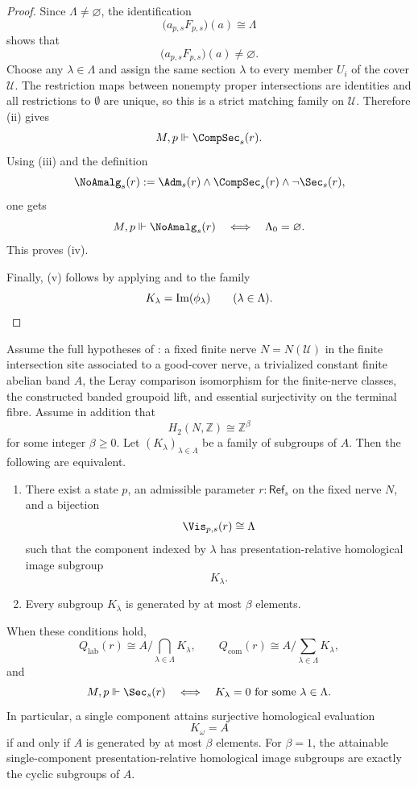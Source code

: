 \begin{proof}
Since $\Lambda\neq\varnothing$, the identification
\[
\bigl(a_{p,s}F_{p,s}\bigr)(a)\cong \Lambda
\]
shows that
\[
\bigl(a_{p,s}F_{p,s}\bigr)(a)\neq\varnothing.
\]
Choose any $\lambda\in\Lambda$ and assign the same section $\lambda$ to
every member $U_i$ of the cover $\mathcal U$. The restriction maps between
nonempty proper intersections are identities and all restrictions to
$\emptyset$ are unique, so this is a strict matching family on
$\mathcal U$. Therefore (ii) gives
\[
M,p\Vdash \CompSec_s(r).
\]
Using \textup{(iii)} and the definition
\[
\NoAmalg_s(r):=\Adm_s(r)\land \CompSec_s(r)\land \neg\Sec_s(r),
\]
one gets
\[
M,p\Vdash \NoAmalg_s(r)
\quad\Longleftrightarrow\quad
\Lambda_0=\varnothing.
\]
This proves \textup{(iv)}.

Finally, \textup{(v)} follows by applying
 and 
to the family
\[
K_\lambda=\operatorname{Im}(\phi_\lambda)
\qquad
(\lambda\in\Lambda).
\qedhere
\]
\end{proof}

\begin{corollary}\label{cor:torsion-free-h2-classification}
Assume the full hypotheses of : a
fixed finite nerve $N=N(\mathcal U)$ in the finite intersection site associated to a good-cover nerve,
a trivialized constant finite abelian band $A$, the Leray comparison
isomorphism for the finite-nerve classes, the constructed banded groupoid
lift, and essential surjectivity on the terminal fibre. Assume
in addition that
\[
H_2(N,\mathbb Z)\cong \mathbb Z^\beta
\]
for some integer $\beta\ge 0$. Let $(K_\lambda)_{\lambda\in\Lambda}$ be a family of subgroups of $A$. Then the following are equivalent.
\begin{enumerate}[label=(\roman*),nosep]
\item There exist a state $p$, an admissible parameter $r:\mathsf{Ref}_s$ on the fixed nerve $N$, and a bijection
\[
\Vis_{p,s}(r)\cong \Lambda
\]
such that the component indexed by $\lambda$ has presentation-relative homological image subgroup
\[
K_\lambda.
\]
\item Every subgroup $K_\lambda$ is generated by at most $\beta$ elements.
\end{enumerate}
When these conditions hold,
\[
Q_{\mathrm{lab}}(r)\cong A\Big/\bigcap_{\lambda\in\Lambda}K_\lambda,
\qquad
Q_{\mathrm{com}}(r)\cong A\Big/\sum_{\lambda\in\Lambda}K_\lambda,
\]
and
\[
M,p\Vdash \Sec_s(r)
\quad\Longleftrightarrow\quad
K_\lambda=0\ \text{for some}\ \lambda\in\Lambda.
\]
In particular, a single component attains surjective homological evaluation
\[
K_\omega=A
\]
if and only if $A$ is generated by at most $\beta$ elements. For $\beta=1$, the attainable single-component presentation-relative homological image subgroups are exactly the cyclic subgroups of $A$.
\end{corollary}

